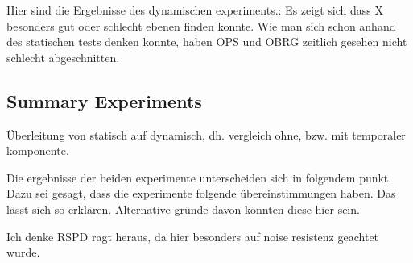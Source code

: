 \documentclass[main.tex]{subfiles}
\begin{document}
Hier sind die Ergebnisse des dynamischen experiments.:
Es zeigt sich dass X besonders gut oder schlecht ebenen finden konnte. Wie man sich schon anhand des statischen tests denken konnte, haben OPS und OBRG zeitlich
gesehen nicht schlecht abgeschnitten.

\subsection*{Summary Experiments}
Überleitung von statisch auf dynamisch, dh. vergleich ohne, bzw. mit temporaler komponente.

Die ergebnisse der beiden experimente unterscheiden sich in folgendem punkt. Dazu sei gesagt, dass die experimente folgende übereinstimmungen haben.
Das lässt sich so erklären. Alternative gründe davon könnten diese hier sein.

Ich denke RSPD ragt heraus, da hier besonders auf noise resistenz geachtet wurde. %
\end{document}
